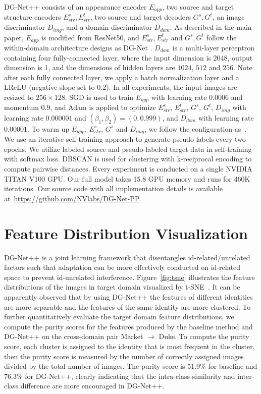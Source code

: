 \documentclass[runningheads]{llncs}
\begin{document}
DG-Net++ consists of an appearance encoder $E_{app}$, two source and target structure encoders $E_{str}^{s}, E_{str}^{t}$, two source and target decoders $G^s, G^t$, an image discriminator $D_{img}$, and a domain discriminator $D_{dom}$. As described in the main paper, $E_{app}$ is modified from ResNet50, and $E_{str}^{s}, E_{str}^{t}$ and $G^s, G^t$ follow the within-domain architecture designs as DG-Net \cite{zheng2019joint}. $D_{dom}$ is a multi-layer perceptron containing four fully-connected layer, where the input dimension is $2048$, output dimension is 1, and the dimensions of hidden layers are $1024$, $512$ and $256$. Note after each fully connected layer, we apply a batch normalization layer \cite{ioffe2015batch} and a LReLU \cite{xu2015empirical} (negative slope set to 0.2). In all experiments, the input images are resized to $256\times128$. SGD is used to train $E_{app}$ with learning rate $0.0006$ and momentum $0.9$, and Adam is applied to optimize $E_{str}^s$, $E_{str}^t$, $G^s$, $G^t$, $D_{img}$ with learning rate $0.000001$ and $(\beta_1, \beta_2) = (0, 0.999)$, and $D_{dom}$ with learning rate $0.00001$. To warm up $E_{app}$, $E_{str}^s$, $G^s$ and $D_{img}$, we follow the configuration as~\cite{zheng2019joint}. 
We use an iterative self-training approach to generate pseudo-labels every two epochs. We utilize labeled source and pseudo-labeled target data in self-training with softmax loss. DBSCAN is used for clustering with k-reciprocal encoding to compute pairwise distances. 
Every experiment is conducted on a single NVIDIA TITAN V100 GPU. Our full model takes 15.8 GPU memory and runs for 460K iterations. Our source code with all implementation details is available at~\url{https://github.com/NVlabs/DG-Net-PP}. 

\section{Feature Distribution Visualization}

DG-Net++ is a joint learning framework that disentangles id-related/unrelated factors such that adaptation can be more effectively conducted on id-related space to prevent id-unrelated interference. Figure~\ref{fig:tsne} illustrates the feature distributions of the images in target domain visualized by t-SNE~\cite{tsne}. It can be apparently observed that by using DG-Net++ the features of different identities are more separable and the features of the same identity are more clustered.          
To further quantitatively evaluate the target domain feature distributions, we compute the purity scores for the features produced by the baseline method and DG-Net++ on the cross-domain pair Market $\rightarrow$ Duke. 
To compute the purity score, each cluster is assigned to the identity that is most frequent in the cluster, then the purity score is measured by the number of correctly assigned images divided by the total number of images. The purity score is 51.9\% for baseline and 76.3\% for DG-Net++, clearly indicating that the intra-class similarity and inter-class difference are more encouraged in DG-Net++.
\end{document}
